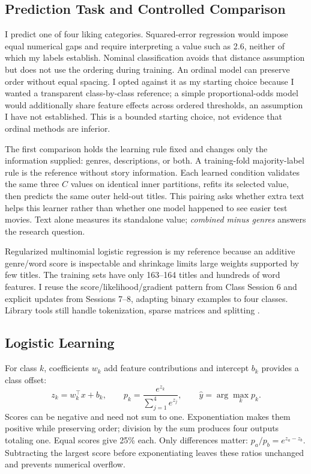 \documentclass[11pt,letterpaper]{article}
\begin{document}
\subsection{Prediction Task and Controlled Comparison}
I predict one of four liking categories. Squared-error regression would impose equal numerical gaps and require interpreting a value such as 2.6, neither of which my labels establish. Nominal classification avoids that distance assumption but does not use the ordering during training. An ordinal model can preserve order without equal spacing. I opted against it as my starting choice because I wanted a transparent class-by-class reference; a simple proportional-odds model would additionally share feature effects across ordered thresholds, an assumption I have not established. This is a bounded starting choice, not evidence that ordinal methods are inferior.

The first comparison holds the learning rule fixed and changes only the information supplied: genres, descriptions, or both. A training-fold majority-label rule is the reference without story information. Each learned condition validates the same three $C$ values on identical inner partitions, refits its selected value, then predicts the same outer held-out titles. This pairing asks whether extra text helps this learner rather than whether one model happened to see easier test movies. Text alone measures its standalone value; \emph{combined minus genres} answers the research question.

Regularized multinomial logistic regression is my reference because an additive genre/word score is inspectable and shrinkage limits large weights supported by few titles. The training sets have only 163--164 titles and hundreds of word features. I reuse the score/likelihood/gradient pattern from Class Session 6 and explicit updates from Sessions 7--8, adapting binary examples to four classes. Library tools still handle tokenization, sparse matrices and splitting \cite{course}.

\subsection{Logistic Learning}
For class $k$, coefficients $w_k$ add feature contributions and intercept $b_k$ provides a class offset:
\[
z_k=w_k^\top x+b_k,\qquad
p_k=\frac{e^{z_k}}{\sum_{j=1}^{4}e^{z_j}},\qquad
\hat y=\arg\max_k p_k.
\]
Scores can be negative and need not sum to one. Exponentiation makes them positive while preserving order; division by the sum produces four outputs totaling one. Equal scores give 25\% each. Only differences matter: $p_a/p_b=e^{z_a-z_b}$. Subtracting the largest score before exponentiating leaves these ratios unchanged and prevents numerical overflow.
\end{document}
